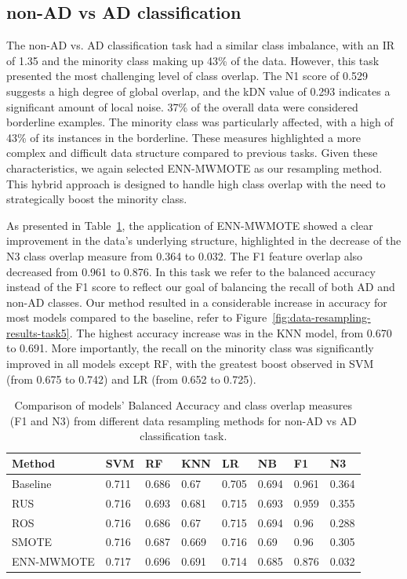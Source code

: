 \subsection{non-AD vs AD classification}
The non-AD vs. AD classification task had a similar class imbalance, with an IR of 1.35 and the minority class making up 43\% of the data. However, this task presented the most challenging level of class overlap. The N1 score of 0.529 suggests a high degree of global overlap, and the kDN value of 0.293 indicates a significant amount of local noise. 37\% of the overall data were considered borderline examples. The minority class was particularly affected, with a high of 43\% of its instances in the borderline. These measures highlighted a more complex and difficult data structure compared to previous tasks. Given these characteristics, we again selected ENN-MWMOTE as our resampling method. This hybrid approach is designed to handle high class overlap with the need to strategically boost the minority class.

As presented in Table~\ref{table:data-resampling-results-task5}, the application of ENN-MWMOTE showed a clear improvement in the data's underlying structure, highlighted in the decrease of the N3 class overlap measure from 0.364 to 0.032. The F1 feature overlap also decreased from 0.961 to 0.876. In this task we refer to the balanced accuracy instead of the F1 score to reflect our goal of balancing the recall of both AD and non-AD classes. Our method resulted in a considerable increase in accuracy for most models compared to the baseline, refer to Figure~\ref{fig:data-resampling-results-task5}. The highest accuracy increase was in the KNN model, from 0.670 to 0.691. More importantly, the recall on the minority class was significantly improved in all models except RF, with the greatest boost observed in SVM (from 0.675 to 0.742) and LR (from 0.652 to 0.725).

\begin{table}[!ht]
    \centering
    \caption{Comparison of models' Balanced Accuracy and class overlap measures (F1 and N3) from different data resampling methods for non-AD vs AD classification task.}
    \begin{tabular}{|l|l|l|l|l|l|l|l|}
    \hline
        Method & SVM & RF & KNN & LR & NB & F1 & N3 \\ \hline
        Baseline & 0.711 & 0.686 & 0.67 & 0.705 & 0.694 & 0.961 & 0.364 \\ \hline
        RUS & 0.716 & 0.693 & 0.681 & 0.715 & 0.693 & 0.959 & 0.355 \\ \hline
        ROS & 0.716 & 0.686 & 0.67 & 0.715 & 0.694 & 0.96 & 0.288 \\ \hline
        SMOTE & 0.716 & 0.687 & 0.669 & 0.716 & 0.69 & 0.96 & 0.305 \\ \hline
        ENN-MWMOTE & 0.717 & 0.696 & 0.691 & 0.714 & 0.685 & 0.876 & 0.032 \\ \hline
    \end{tabular}
    \label{table:data-resampling-results-task5}
\end{table}


